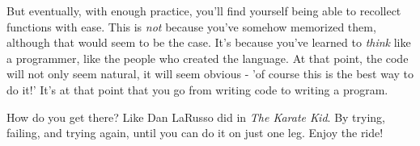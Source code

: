 \documentclass[12pt]{article}
\begin{document}
But eventually, with enough practice, you'll find yourself being able to recollect functions with ease. This is \textit{not} because you've somehow memorized them, although that would seem to be the case. It's because you've learned to \textit{think} like a programmer, like the people who created the language. At that point, the code will not only seem natural, it will seem obvious - 'of course this is the best way to do it!' It's at that point that you go from writing code to writing a program. 

How do you get there? Like Dan LaRusso did in \textit{The Karate Kid}. By trying, failing, and trying again, until you can do it on just one leg. Enjoy the ride!
\end{document}
